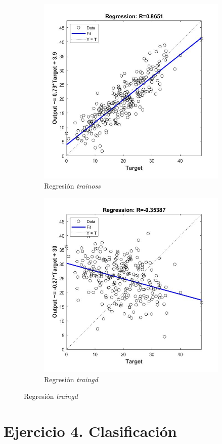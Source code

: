 \documentclass{article}
\begin{document}
\begin{figure}[H]
\begin{subfigure}{0.4\textwidth}
  \includegraphics[width=0.8\linewidth]{../images/I_ex3_regression_bodyfat_dataset_trainoss.jpg}
  \caption{Regresión \textit{trainoss}}
 \end{subfigure}
 \begin{subfigure}{0.4\textwidth}
  \includegraphics[width=0.8\linewidth]{../images/I_ex3_regression_bodyfat_dataset_traingd.jpg}
  \caption{Regresión \textit{traingd}}
 \end{subfigure}
\end{figure}

\section{Ejercicio 4. Clasificación}
\end{document}
